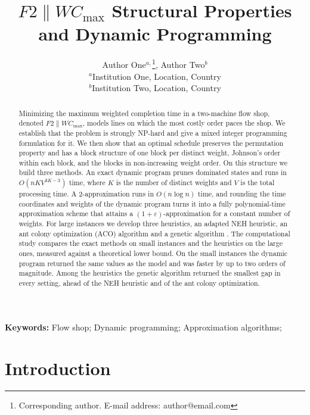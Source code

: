 \documentclass[12pt]{article}
\title{\LARGE\bf $F2 \parallel W C_{\max}$ Structural Properties and Dynamic Programming}
\author{Author One$^{a,}$\footnote{Corresponding author. E-mail address: author@email.com}, Author Two$^{b}$\\
{\small $^{a}$Institution One, Location, Country}\\
{\small $^{b}$Institution Two, Location, Country}\\}
\date{}
\let\origsection\section
\renewcommand{\section}{\FloatBarrier\origsection}
\begin{document}
\begin{sloppypar}

\maketitle

\begin{abstract}
    Minimizing the maximum weighted completion time in a two-machine flow shop, denoted
    $F2 \parallel WC_{\max}$, models lines on which the most costly order paces the shop.
    We establish that the problem is strongly NP-hard and give a mixed integer programming
    formulation for it. We then show that an optimal schedule preserves the permutation
    property and has a block structure of one block per distinct weight, Johnson's order
    within each block, and the blocks in non-increasing weight order. On this structure we
    build three methods. An exact dynamic program prunes dominated states and runs in
    $O(nKV^{3K-3})$ time, where $K$ is the number of distinct weights and $V$ is the total
    processing time. A 2-approximation runs in $O(n\log n)$ time, and rounding the time
    coordinates and weights of the dynamic program turns it into a fully polynomial-time
    approximation scheme that attains a $(1+\varepsilon)$-approximation for a constant
    number of weights. For large instances we develop three heuristics, an adapted NEH
    heuristic, an ant colony optimization (ACO) algorithm \citep{zhang2023} and a genetic
    algorithm \citep{reeves1995}. The computational study compares the exact methods on
    small instances and the heuristics on the large ones, measured against a
    theoretical lower bound. On the small instances the dynamic program returned the same
    values as the model and was faster by up to two orders of magnitude. Among the
    heuristics the genetic algorithm returned the smallest gap in every setting, ahead of
    the NEH heuristic and of the ant colony optimization.
\end{abstract}



\noindent \textbf{Keywords:} Flow shop; Dynamic programming; Approximation algorithms; 

\section{Introduction}
\label{sec:intro}


\end{sloppypar}
\end{document}
